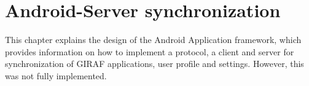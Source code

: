 \chapter{Android-Server synchronization}
\label{androidDesign}
This chapter explains the design of the Android Application framework, which provides information on how to implement a protocol, a client and server for synchronization of GIRAF applications, user profile and settings. However, this was not fully implemented. 